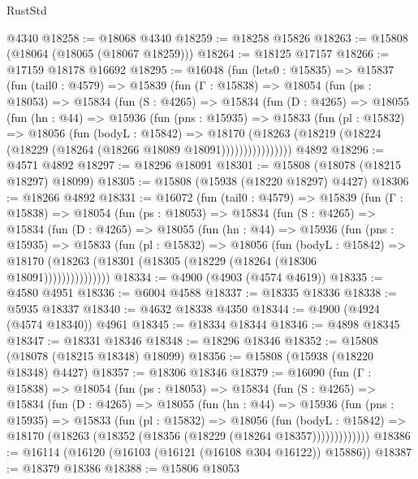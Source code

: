 \begin{lexlean}{RustStd}
\begin{coremodule}
    @4340
@18258 := @18068 @4340
@18259 := @18258 @15826
@18263 := @15808 (@18064 (@18065 (@18067 @18259)))
@18264 := @18125 @17157
@18266 := @17159 @18178 @16692
@18295 := @16048
    (fun (lets0 : @15835) =>
    @15837
      (fun (tail0 : @4579) =>
      @15839
        (fun (Γ : @15838) =>
        @18054
          (fun (ps : @18053) =>
          @15834
            (fun (S : @4265) =>
            @15834
              (fun (D : @4265) =>
              @18055
                (fun (hn : @44) =>
                @15936
                  (fun (pns : @15935) =>
                  @15833
                    (fun (pl : @15832) =>
                    @18056
                      (fun (bodyL : @15842) =>
                      @18170
                        (@18263
                          (@18219 (@18224 (@18229 (@18264 (@18266 @18089 @18091))))))))))))))))
    @4892
@18296 := @4571 @4892
@18297 := @18296 @18091
@18301 := @15808 (@18078 (@18215 @18297) @18099)
@18305 := @15808 (@15938 (@18220 @18297) @4427)
@18306 := @18266 @4892
@18331 := @16072
    (fun (tail0 : @4579) =>
    @15839
      (fun (Γ : @15838) =>
      @18054
        (fun (ps : @18053) =>
        @15834
          (fun (S : @4265) =>
          @15834
            (fun (D : @4265) =>
            @18055
              (fun (hn : @44) =>
              @15936
                (fun (pns : @15935) =>
                @15833
                  (fun (pl : @15832) =>
                  @18056
                    (fun (bodyL : @15842) =>
                    @18170 (@18263 (@18301 (@18305 (@18229 (@18264 (@18306 @18091)))))))))))))))
@18334 := @4900 (@4903 (@4574 @4619))
@18335 := @4580 @4951
@18336 := @6004 @4588
@18337 := @18335 @18336
@18338 := @5935 @18337
@18340 := @4632 @18338 @4350
@18344 := @4900 (@4924 (@4574 @18340)) @4961
@18345 := @18334 @18344
@18346 := @4898 @18345
@18347 := @18331 @18346
@18348 := @18296 @18346
@18352 := @15808 (@18078 (@18215 @18348) @18099)
@18356 := @15808 (@15938 (@18220 @18348) @4427)
@18357 := @18306 @18346
@18379 := @16090
    (fun (Γ : @15838) =>
    @18054
      (fun (ps : @18053) =>
      @15834
        (fun (S : @4265) =>
        @15834
          (fun (D : @4265) =>
          @18055
            (fun (hn : @44) =>
            @15936
              (fun (pns : @15935) =>
              @15833
                (fun (pl : @15832) =>
                @18056
                  (fun (bodyL : @15842) =>
                  @18170 (@18263 (@18352 (@18356 (@18229 (@18264 @18357)))))))))))))
@18386 := @16114 (@16120 (@16103 (@16121 (@16108 @304 @16122)) @15886))
@18387 := @18379 @18386
@18388 := @15806 @18053

\end{coremodule}
\end{lexlean}

